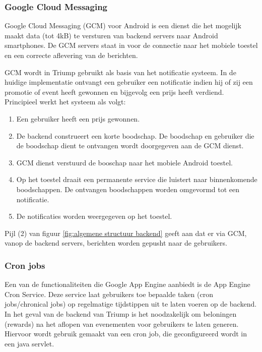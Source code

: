 \subsubsection{Google Cloud Messaging}
Google Cloud Messaging (GCM) voor Android is een dienst die het mogelijk maakt data (tot 4kB) te versturen van backend servers naar Android smartphones. De GCM servers staat in voor de connectie naar het mobiele toestel en een correcte aflevering van de berichten.

GCM wordt in Triump gebruikt als basis van het notificatie systeem. In de huidige implementatie ontvangt een gebruiker een notificatie indien hij of zij een promotie of event heeft gewonnen en bijgevolg een prijs heeft verdiend. Principieel werkt het systeem als volgt:
\begin{enumerate}
  \item Een gebruiker heeft een prijs gewonnen.
  \item De backend construeert een korte boodschap. De boodschap en gebruiker die de boodschap dient te ontvangen wordt doorgegeven aan de GCM dienst. 
  \item GCM dienst verstuurd de booschap naar het mobiele Android toestel.
  \item Op het toestel draait een permanente service die luistert naar binnenkomende boodschappen. De ontvangen boodschappen worden omgevormd tot een notificatie.
  \item De notificaties worden weergegeven op het toestel.
\end{enumerate}
Pijl (2) van figuur \ref{fig:algemene structuur backend} geeft aan dat er via GCM, vanop de backend servers, berichten worden gepusht naar de gebruikers.
\subsubsection{Cron jobs}

Een van de functionaliteiten die Google App Engine aanbiedt is de App Engine Cron Service. Deze service laat gebruikers toe bepaalde taken (cron jobs/chronical jobs) op regelmatige tijdstippen uit te laten voeren op de backend. In het geval van de backend van Triump is het noodzakelijk om beloningen (rewards) na het aflopen van evenementen voor gebruikers te laten generen. Hiervoor wordt gebruik gemaakt van een cron job, die geconfigureerd wordt in een java servlet.




